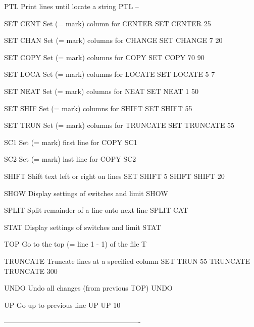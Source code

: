 PTL       Print lines until locate a string           PTL --
 
SET CENT  Set (= mark) column for CENTER              SET CENTER 25
 
SET CHAN  Set (= mark) columns for CHANGE             SET CHANGE 7 20
 
SET COPY  Set (= mark) columns for COPY               SET COPY 70 90
 
SET LOCA  Set (= mark) columns for LOCATE             SET LOCATE 5 7
 
SET NEAT  Set (= mark) columns for NEAT               SET NEAT 1 50
 
SET SHIF  Set (= mark) columns for SHIFT              SET SHIFT 55
 
SET TRUN  Set (= mark) columns for TRUNCATE           SET TRUNCATE 55
 
SC1       Set (= mark) first line for COPY            SC1
 
SC2       Set (= mark) last  line for COPY            SC2
 
SHIFT     Shift text left or right on lines           SET SHIFT 5
                                                      SHIFT
                                                      SHIFT 20
 
SHOW      Display settings of switches and limit      SHOW
 
SPLIT     Split remainder of a line onto next line    SPLIT CAT
 
STAT      Display settings of switches and limit      STAT
 
TOP       Go to the top (= line 1 - 1) of the file    T
 
TRUNCATE  Truncate lines at a specified column        SET TRUN 55
                                                      TRUNCATE
                                                      TRUNCATE 300
 
UNDO      Undo all changes (from previous TOP)        UNDO
 
UP        Go up to previous line                      UP
                                                      UP 10
 
----------------------------------------------------------
 
 
 
 
 
 
 
 
 
 
 
 
 
 
 
